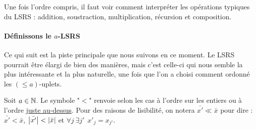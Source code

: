 \documentclass{report}
\newcommand{\leqa}{\left( \leqslant a \right)}
\begin{document}
Une fois l'ordre compris, il faut voir comment interpréter les opérations typiques du LSRS : addition, soustraction, multiplication, récursion et composition.


		\paragraph{Définissons le $a$-LSRS}
		
		Ce qui suit est la piste principale que nous suivons en ce moment. Le LSRS pourrait être élargi de bien des manières, mais c'est celle-ci qui nous semble la plus intéressante et la plus naturelle, une fois que l'on a choisi comment ordonné les $\leqa$-uplets.
		
		Soit $a \in \mathbb{N}$. Le symbole "$<$" renvoie selon les cas à l'ordre sur les entiers ou à l'ordre \hyperref[def:bon_ordre_sur_uplets]{juste au-dessus}. Pour des raisons de lisibilité, on notera $\bar{x'} \ll \bar{x}$ pour dire :  $\bar{x'} < \bar{x}$, $\left|\bar{x'}\right| < \left|\bar{x}\right|$ et $\forall j \: \exists j' \:\: x'_j = x_{j'}$\footnotemark.
		
		
\end{document}
